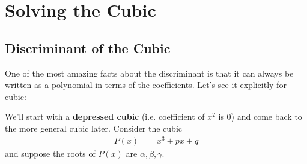 \documentclass[reqno, 12pt, letter]{article}
\theoremstyle{plain}
\theoremstyle{definition}
\newtheorem{exercise}[theorem]{Exercise}
\theoremstyle{remark}
\numberwithin{equation}{section}
\newcommand\br{{\mathbb R}}
\begin{document}
\newpage
\section{Solving the Cubic}

	
	
	
	\subsection{Discriminant of the Cubic}
One of the most amazing facts about the discriminant is that it can always be written as a polynomial in terms of the coefficients. Let's see it explicitly for cubic:
	

	We'll start with a \textbf{depressed cubic} (i.e. coefficient of $ x^2$ is 0) and come back to the more general cubic later. Consider the cubic
		\begin{align*}
			P(x) &= x^3 + px + q
		\end{align*}
	and suppose the roots of $ P(x)$ are $\alpha,\beta,\gamma$.
	
\end{document}
